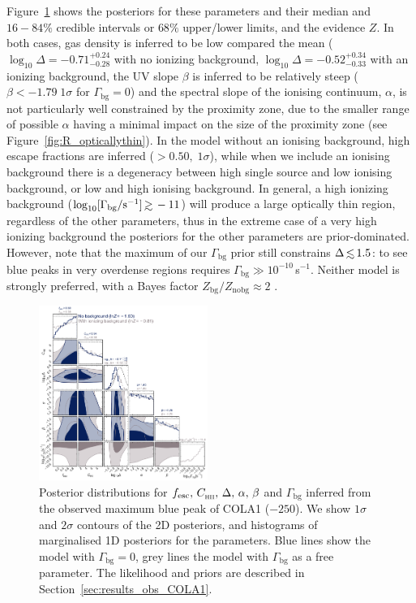 \documentclass[fleqn,usenatbib]{mnras}
\begin{document}
Figure~\ref{fig:COLA1} shows the posteriors for these parameters and their median and $16-84\%$ credible intervals or $68\%$ upper/lower limits, and the evidence $Z$. In both cases, gas density is inferred to be low compared the mean ($\log_{10} \Delta = -0.71_{-0.28}^{+0.24}$ with no ionizing background, $\log_{10} \Delta = -0.52_{-0.33}^{+0.34}$ with an ionizing background, the UV slope $\beta$ is inferred to be relatively steep ($\beta < -1.79 \; 1\sigma$ for $\Gamma_\mathrm{bg} = 0$) and the spectral slope of the ionising continuum, $\alpha$, is not particularly well constrained by the proximity zone, due to the smaller range of possible $\alpha$ having a minimal impact on the size of the proximity zone (see Figure~\ref{fig:R_opticallythin}). In the model without an ionising background, high escape fractions are inferred ($>0.50, \; 1\sigma$), while when we include an ionising background there is a degeneracy between high single source \fesc and low ionising background, or low \fesc and high ionising background. In general, a high ionizing background ($\log_{10}[\Gamma_\mathrm{bg}/\mathrm{s}^{-1}] \simgt -11$) will produce a large optically thin region, regardless of the other parameters, thus in the extreme case of a very high ionizing background the posteriors for the other parameters are prior-dominated. However, note that the maximum of our $\Gamma_\mathrm{bg}$ prior still constrains $\Delta \simlt 1.5$: to see blue peaks in very overdense regions requires $\Gamma_\mathrm{bg} \gg 10^{-10}$\,s$^{-1}$. Neither model is strongly preferred, with a Bayes factor $Z_\mathrm{bg}/Z_\mathrm{no bg} \approx 2$ \citep[e.g.,][]{Trotta2008}.

\begin{figure}
    \includegraphics[width=0.49\textwidth]{figs/fig7.pdf}
    \caption{Posterior distributions for $\fesc, \, \clump, \, \Delta, \, \alpha, \, \beta$ and $\Gamma_\textrm{bg}$ inferred from the observed maximum blue \lya peak of COLA1 ($-250$\kms). We show $1\sigma$ and $2\sigma$ contours of the 2D posteriors, and histograms of marginalised 1D posteriors for the parameters. Blue lines show the model with $\Gamma_\mathrm{bg}=0$, grey lines the model with $\Gamma_\mathrm{bg}$ as a free parameter. The likelihood and priors are described in Section~\ref{sec:results_obs_COLA1}.}
    \label{fig:COLA1}
\end{figure}
\end{document}
